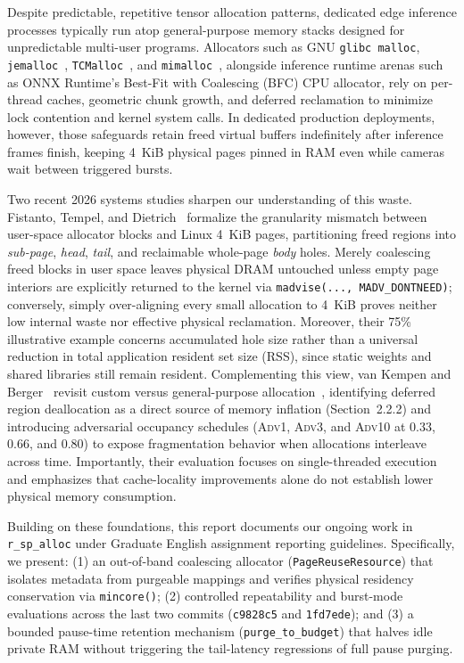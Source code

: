 \documentclass[sigconf,screen,nonacm]{acmart}
\begin{document}
Despite predictable, repetitive tensor allocation patterns, dedicated edge inference processes typically run atop general-purpose memory stacks designed for unpredictable multi-user programs. Allocators such as GNU \texttt{glibc malloc}, \texttt{jemalloc}~\cite{evans2006jemalloc}, \texttt{TCMalloc}~\cite{ghemawat2005tcmalloc}, and \texttt{mimalloc}~\cite{leijen2019mimalloc}, alongside inference runtime arenas such as ONNX Runtime's Best-Fit with Coalescing (BFC) CPU allocator, rely on per-thread caches, geometric chunk growth, and deferred reclamation to minimize lock contention and kernel system calls. In dedicated production deployments, however, those safeguards retain freed virtual buffers indefinitely after inference frames finish, keeping 4~KiB physical pages pinned in RAM even while cameras wait between triggered bursts.

Two recent 2026 systems studies sharpen our understanding of this waste. Fistanto, Tempel, and Dietrich~\cite{fistanto2026lostbytes} formalize the granularity mismatch between user-space allocator blocks and Linux 4~KiB pages, partitioning freed regions into \textit{sub-page}, \textit{head}, \textit{tail}, and reclaimable whole-page \textit{body} holes. Merely coalescing freed blocks in user space leaves physical DRAM untouched unless empty page interiors are explicitly returned to the kernel via \texttt{madvise(..., MADV\_DONTNEED)}; conversely, simply over-aligning every small allocation to 4~KiB proves neither low internal waste nor effective physical reclamation. Moreover, their 75\% illustrative example concerns accumulated hole size rather than a universal reduction in total application resident set size (RSS), since static weights and shared libraries still remain resident. Complementing this view, van Kempen and Berger~\cite{vankempen2026reconsidering} revisit custom versus general-purpose allocation~\cite{berger2002reconsidering}, identifying deferred region deallocation as a direct source of memory inflation (Section~2.2.2) and introducing adversarial occupancy schedules (\textsc{Adv1}, \textsc{Adv3}, and \textsc{Adv10} at 0.33, 0.66, and 0.80) to expose fragmentation behavior when allocations interleave across time. Importantly, their evaluation focuses on single-threaded execution and emphasizes that cache-locality improvements alone do not establish lower physical memory consumption.

Building on these foundations, this report documents our ongoing work in \texttt{r\_sp\_alloc} under Graduate English assignment reporting guidelines. Specifically, we present: (1) an out-of-band coalescing allocator (\texttt{PageReuseResource}) that isolates metadata from purgeable mappings and verifies physical residency conservation via \texttt{mincore()}; (2) controlled repeatability and burst-mode evaluations across the last two commits (\texttt{c9828c5} and \texttt{1fd7ede}); and (3) a bounded pause-time retention mechanism (\texttt{purge\_to\_budget}) that halves idle private RAM without triggering the tail-latency regressions of full pause purging.
\end{document}
